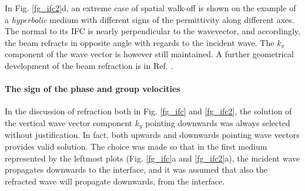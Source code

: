 In Fig. \ref{fg_ifc2}d, an extreme case of spatial walk-off is shown on the example of a \textit{hyperbolic} medium with different signs of the permittivity along different axes. %
 The normal to its IFC is nearly perpendicular to the wavevector, and accordingly, the beam refracts in opposite angle with regards to the incident wave. The $k_x$ component of the wave vector is however still maintained. A further geometrical development of the beam refraction is in Ref. \cite[p. 46]{klingshirn2007semiconductor}.


\paragraph{The sign of the phase and group velocities}  %
In the discussion of refraction both in Fig. \ref{fg_ifc} and \ref{fg_ifc2}, the solution of the vertical wave vector component $k_y$ pointing downwards was always selected without justification. In fact, both upwards and downwards pointing wave vectors provides valid solution. The choice was made so that in the first medium represented by the leftmost plots (Fig. \ref{fg_ifc}a and \ref{fg_ifc2}a), the incident wave propagates downwards to the interface, and it was assumed that also the refracted wave will propagate downwards, from the interface.

